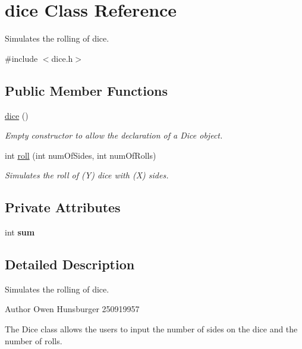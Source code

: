 \hypertarget{classdice}{}\section{dice Class Reference}
\label{classdice}


Simulates the rolling of dice.  




{\ttfamily \#include $<$dice.\+h$>$}

\subsection*{Public Member Functions}
\begin{DoxyCompactItemize}
\item 
\hyperlink{classdice_adfe43c5d338217b1c97c7b4cae67ae0b}{dice} ()
\begin{DoxyCompactList}\small\item\em Empty constructor to allow the declaration of a Dice object. \end{DoxyCompactList}\item 
int \hyperlink{classdice_aa8adb2ec6d5d5b601826868bd6619aa0}{roll} (int num\+Of\+Sides, int num\+Of\+Rolls)
\begin{DoxyCompactList}\small\item\em Simulates the roll of (Y) dice with (X) sides. \end{DoxyCompactList}\end{DoxyCompactItemize}
\subsection*{Private Attributes}
\begin{DoxyCompactItemize}
\item 
\mbox{\label{classdice_a6eb1a540f3a82ef120f41affddf36ed0}} 
int {\bfseries sum}
\end{DoxyCompactItemize}


\subsection{Detailed Description}
Simulates the rolling of dice. 

\begin{DoxyAuthor}{Author}
Owen Hunsburger 250919957
\end{DoxyAuthor}
The Dice class allows the users to input the number of sides on the dice and the number of rolls. 

